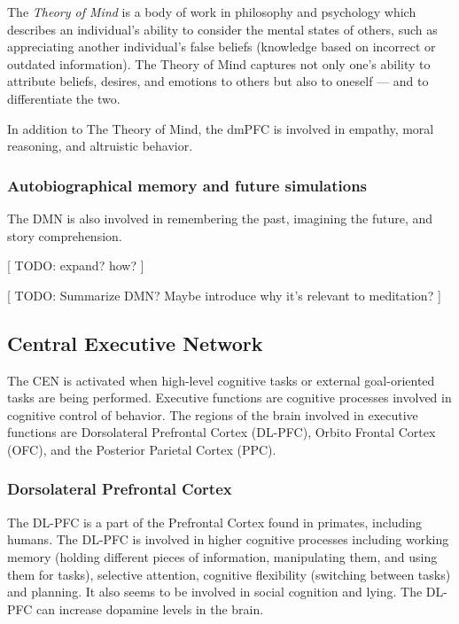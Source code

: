 \documentclass[twocolumn]{article}
\begin{document}
The \textit{Theory of Mind} is a body of work in philosophy and psychology which
describes an individual's ability to consider the mental states of others, such as
appreciating another individual's false beliefs (knowledge based on incorrect or
outdated information). The Theory of Mind captures not only one's ability to
attribute beliefs, desires, and emotions to others but also to oneself --- and to
differentiate the two. \cite{autistictheoryofmind}

In addition to The Theory of Mind, the dmPFC is involved in empathy, moral reasoning,
and altruistic behavior. \cite{defaultnetworkadaptive,dmpfcothers,dmpfcaltruism}

\subsubsection{Autobiographical memory and future simulations}

The DMN is also involved in remembering the past, imagining the future, and story
comprehension. \cite{defaultnetworkadaptive}

[ TODO: expand? how? ]

[ TODO: Summarize DMN? Maybe introduce why it's relevant to meditation? ]

\subsection{Central Executive Network}

The CEN is activated when high-level cognitive tasks or external goal-oriented tasks
are being performed. Executive functions are cognitive processes involved in
cognitive control of behavior. The regions of the brain involved in executive
functions are Dorsolateral Prefrontal Cortex (DL-PFC), Orbito Frontal Cortex (OFC),
and the Posterior Parietal Cortex (PPC).

\subsubsection{Dorsolateral Prefrontal Cortex}

The DL-PFC is a part of the Prefrontal Cortex found in primates, including
humans. The DL-PFC is involved in higher cognitive processes including working memory
(holding different pieces of information, manipulating them, and using them for
tasks), selective attention, cognitive flexibility (switching between tasks) and
planning. It also seems to be involved in social cognition and lying. The DL-PFC can
increase dopamine levels in the brain. \cite{dlpfcmemory,dlpfctasks,dlpfclying}
\end{document}
